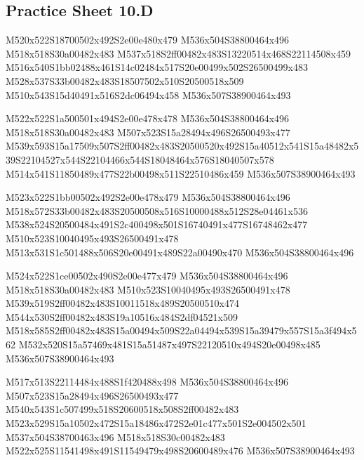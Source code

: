 \documentclass{article}
\begin{document}
\subsection{Practice Sheet 10.D}

\begin{multicols}{5}
\begin{center}

M520x522S18700502x492S2e00e480x479 %
M536x504S38800464x496 %
M518x518S30a00482x483 %
M537x518S2ff00482x483S13220514x468S22114508x459 %
M516x540S1bb02488x461S14c02484x517S20e00499x502S26500499x483 %
M528x537S33b00482x483S18507502x510S20500518x509 %
M510x543S15d40491x516S2dc06494x458 %
M536x507S38900464x493 %
\vfil
\columnbreak

M522x522S1a500501x494S2e00e478x478 %
M536x504S38800464x496 %
M518x518S30a00482x483 %
M507x523S15a28494x496S26500493x477 %
M539x593S15a17509x507S2ff00482x483S20500520x492S15a40512x541S15a48482x539S22104527x544S22104466x544S18048464x576S18040507x578 %
M514x541S11850489x477S22b00498x511S22510486x459 %
M536x507S38900464x493 %
\vfil
\columnbreak

M523x522S1bb00502x492S2e00e478x479 %
M536x504S38800464x496 %
M518x572S33b00482x483S20500508x516S10000488x512S28e04461x536 %
M538x524S20500484x491S2c400498x501S16740491x477S16748462x477 %
M510x523S10040495x493S26500491x478 %
M513x531S1c501488x506S20e00491x489S22a00490x470 %
M536x504S38800464x496 %
\vfil
\columnbreak

M524x522S1ce00502x490S2e00e477x479 %
M536x504S38800464x496 %
M518x518S30a00482x483 %
M510x523S10040495x493S26500491x478 %
M539x519S2ff00482x483S10011518x489S20500510x474 %
M544x530S2ff00482x483S19a10516x484S2df04521x509 %
M518x585S2ff00482x483S15a00494x509S22a04494x539S15a39479x557S15a3f494x562 %
M532x520S15a57469x481S15a51487x497S22120510x494S20e00498x485 %
M536x507S38900464x493 %
\vfil
\columnbreak

M517x513S22114484x488S1f420488x498 %
M536x504S38800464x496 %
M507x523S15a28494x496S26500493x477 %
M540x543S1c507499x518S20600518x508S2ff00482x483 %
M523x529S15a10502x472S15a18486x472S2e01c477x501S2e004502x501 %
M537x504S38700463x496 %
M518x518S30c00482x483 %
M522x525S11541498x491S11549479x498S20600489x476 %
M536x507S38900464x493 %
\vfil

\end{center}
\end{multicols}
\end{document}
